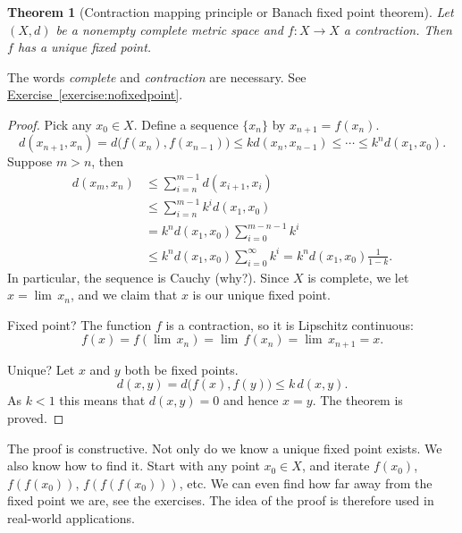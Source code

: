 \documentclass[12pt,openany]{book}
\newcommand{\myindex}[1]{#1\index{#1}}
\theoremstyle{plain}
\newtheorem{thm}{Theorem}[section]
\theoremstyle{remark}
\theoremstyle{definition}
\theoremstyle{exercise}
\theoremstyle{example}
\newcommand{\exerciseref}[1]{\hyperref[#1]{Exercise~\ref*{#1}}}
\begin{document}
\begin{thm}%
[Contraction mapping principle
or \myindex{Banach fixed point theorem}]
\label{thm:contr}
Let $(X,d)$ be a nonempty complete metric space and $f \colon X \to X$ a
contraction.
Then $f$ has a unique fixed point.
\end{thm}

The words \emph{complete} and \emph{contraction} are necessary.
See \exerciseref{exercise:nofixedpoint}.

\begin{proof}
Pick any $x_0 \in X$.
Define a sequence $\{ x_n \}$ by $x_{n+1} = f(x_n)$.
\begin{equation*}
d(x_{n+1},x_n) = d\bigl(f(x_n),f(x_{n-1})\bigr)
\leq k d(x_n,x_{n-1})
\leq \cdots
\leq k^n d(x_1,x_0) .
\end{equation*}
Suppose $m > n$, then
\begin{equation*}
\begin{split}
d(x_m,x_n)
& \leq \sum_{i=n}^{m-1} d(x_{i+1},x_i) \\
& \leq \sum_{i=n}^{m-1} k^i d(x_1,x_0) \\
& = k^n d(x_1,x_0) \sum_{i=0}^{m-n-1} k^i \\
& \leq k^n d(x_1,x_0) \sum_{i=0}^{\infty} k^i
= k^n d(x_1,x_0) \frac{1}{1-k} .
\end{split}
\end{equation*}
In particular, the sequence is Cauchy (why?).  Since $X$ is complete,
we let $x = \lim\, x_n$, and we claim that $x$
is our unique fixed point.

Fixed point?  The function $f$ is a contraction,
so it is Lipschitz continuous:
\begin{equation*}
f(x) = f( \lim \, x_n) = \lim\, f(x_n) = \lim\, x_{n+1} = x .
\end{equation*}

Unique?  Let $x$ and $y$ both be fixed points.
\begin{equation*}
d(x,y) = d\bigl(f(x),f(y)\bigr) \leq k\, d(x,y) .
\end{equation*}
As $k < 1$ this means that $d(x,y) = 0$ and hence $x=y$.  The theorem is
proved.
\end{proof}

The proof is constructive.  Not only do we know 
a unique fixed point exists.  We also know how to find it.  Start with
any point $x_0 \in X$, and iterate $f(x_0)$,
$f(f(x_0))$,
$f(f(f(x_0)))$, etc.  We can even find how far away
from the fixed point we are, see the exercises.  The idea of the proof is
therefore used in real-world applications.
\end{document}
